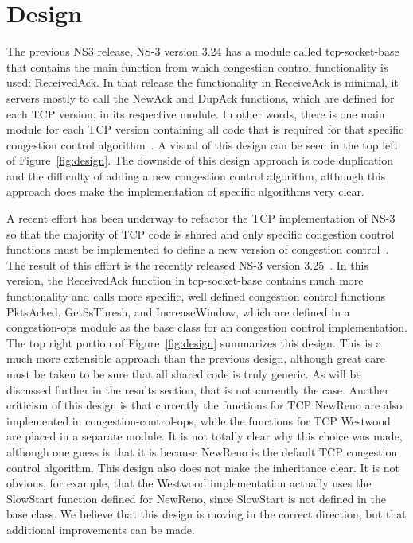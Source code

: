 \documentclass[11pt]{ucthesis}
\begin{document}
\section{Design}

The previous NS3 release, NS-3 version 3.24 has a module called tcp-socket-base that contains the main function from which congestion control functionality is used: ReceivedAck. In that release the functionality in ReceiveAck is minimal, it servers mostly to call the NewAck and DupAck functions, which are defined for each TCP version, in its respective module. In other words, there is one main module for each TCP version containing all code that is required for that specific congestion control algorithm~\cite{NS324Code}. A visual of this design can be seen in the top left of Figure~\ref{fig:design}. The downside of this design approach is code duplication and the difficulty of adding a new congestion control algorithm, although this approach does make the implementation of specific algorithms very clear. 

A recent effort has been underway to refactor the TCP implementation of NS-3 so that the majority of TCP code is shared and only specific congestion control functions must be implemented to define a new version of congestion control~\cite{NS3Patch}. The result of this effort is the recently released NS-3 version 3.25~\cite{NS325Code}. In this version, the ReceivedAck function in tcp-socket-base contains much more functionality and calls more specific, well defined congestion control functions PktsAcked, GetSsThresh, and IncreaseWindow, which are defined in a congestion-ops module as the base class for an congestion control implementation. The top right portion of Figure~\ref{fig:design} summarizes this design. This is a much more extensible approach than the previous design, although great care must be taken to be sure that all shared code is truly generic. As will be discussed further in the results section, that is not currently the case. Another criticism of this design is that currently the functions for TCP NewReno are also implemented in congestion-control-ops, while the functions for TCP Westwood are placed in a separate module. It is not totally clear why this choice was made, although one guess is that it is because NewReno is the default TCP congestion control algorithm. This design also does not make the inheritance clear. It is not obvious, for example, that the Westwood implementation actually uses the SlowStart function defined for NewReno, since SlowStart is not defined in the base class. We believe that this design is moving in the correct direction, but that additional improvements can be made. 
\end{document}
